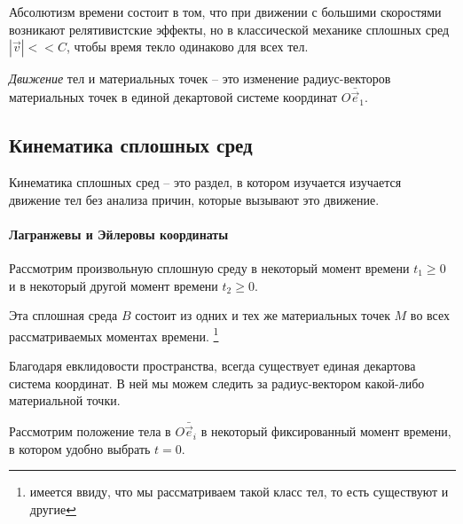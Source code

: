 Абсолютизм времени состоит в том, что при движении с большими скоростями возникают релятивистские 
эффекты, но в классической механике сплошных сред $|\vec{v}| << C$, чтобы время текло одинаково
для всех тел.

\begin{definition}
  \emph{Движение} тел и материальных точек -- это изменение радиус-векторов материальных точек в
  единой декартовой системе координат $O \bar{\vec{e}}_1$.
\end{definition}

%	

\subsection{Кинематика сплошных сред}

\begin{definition}
  Кинематика сплошных сред -- это раздел, в котором изучается изучается движение тел без анализа
  причин, которые вызывают это движение.
\end{definition}

\paragraph{Лагранжевы и Эйлеровы координаты}

\begin{figure}[H]
	\centering
	
\end{figure}

Рассмотрим произвольную сплошную среду в некоторый момент времени $t_1 \geqslant 0$ и в некоторый
другой момент времени $t_2 \geqslant 0$.

Эта сплошная среда $B$ состоит из одних и тех же материальных точек $M$ во всех рассматриваемых 
моментах времени. \footnote{имеется ввиду, что мы рассматриваем такой класс тел, то есть существуют
и другие}
  
Благодаря евклидовости пространства, всегда существует единая декартова система координат. В
ней мы можем следить за радиус-вектором какой-либо материальной точки.

Рассмотрим положение тела в $O\bar{\vec{e}}_i$ в некоторый фиксированный момент времени, 
в котором удобно выбрать $t=0$.

\begin{figure}[H]
	\centering
	
\end{figure}

